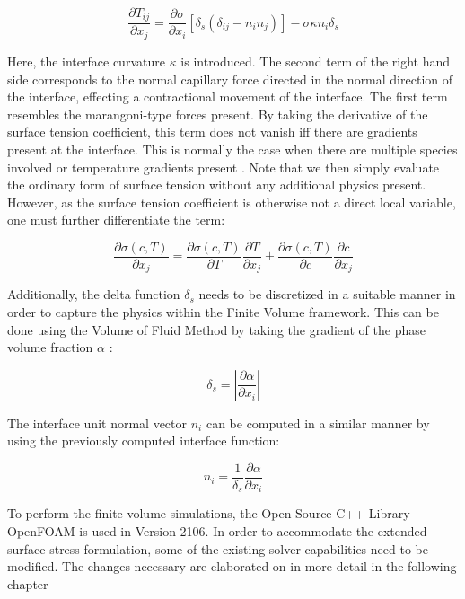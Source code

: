 \documentclass[conference,final]{IEEEtran}
\begin{document}
\begin{equation}
    \frac{\partial T_{ij}}{\partial x_j} = \frac{\partial \sigma}{\partial x_i} [\delta_s(\delta_{ij} - n_i n_j)] - \sigma \kappa n_i \delta_s
\end{equation}

Here, the interface curvature $\kappa$ is introduced. The second term of the right hand side corresponds to the normal capillary force directed in the normal direction of the interface, effecting a contractional movement of the interface. The first term resembles the marangoni-type forces present. By taking the derivative of the surface tension coefficient, this term does not vanish iff there are gradients present at the interface. This is normally the case when there are multiple species involved or temperature gradients present \cite{j.straubThermokapillareGrenzflachenkonvektionGasblasen1990}. Note that we then simply evaluate the ordinary form of surface tension without any additional physics present. However, as the surface tension coefficient is otherwise not a direct local variable, one must further differentiate the term:

\begin{equation}
    \frac{\partial \sigma(c,T)}{\partial x_j} = \frac{\partial \sigma(c,T)}{\partial T} \frac{\partial T}{\partial x_j} + \frac{\partial \sigma(c,T)}{\partial c} \frac{\partial c}{\partial x_j}
    \label{eq:sigmadiff}
\end{equation}

Additionally, the delta function $\delta_s$ needs to be discretized in a suitable manner in order to capture the physics within the Finite Volume framework. This can be done using the Volume of Fluid Method by taking the gradient of the phase volume fraction $\alpha$ \cite{gueyffierVolumeofFluidInterfaceTracking1999,hirtVolumeFluidVOF1981}:

\begin{equation}
    \delta_s = \left\lvert \frac{\partial \alpha}{\partial x_i} \right\rvert
\end{equation}

The interface unit normal vector $n_i$ can be computed in a similar manner by using the previously computed interface function:

\begin{equation}
    n_i = \frac{1}{\delta_s} \frac{\partial \alpha}{\partial x_i}
\end{equation}

To perform the finite volume simulations, the Open Source C++ Library OpenFOAM is used in Version 2106. In order to accommodate the extended surface stress formulation, some of the existing solver capabilities need to be modified. The changes necessary are elaborated on in more detail in the following chapter
\end{document}
